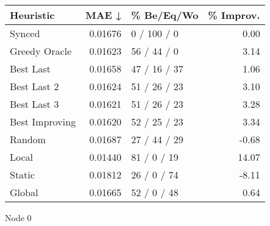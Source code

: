 \begin{tabular}{lrlr}
\toprule
\textbf{Heuristic} & \textbf{MAE ↓} & \textbf{\% Be/Eq/Wo} & \textbf{\% Improv.} \\
\midrule
            Synced &        0.01676 &          0 / 100 / 0 &                0.00 \\
     Greedy Oracle &        0.01623 &          56 / 44 / 0 &                3.14 \\
         Best Last &        0.01658 &         47 / 16 / 37 &                1.06 \\
       Best Last 2 &        0.01624 &         51 / 26 / 23 &                3.10 \\
       Best Last 3 &        0.01621 &         51 / 26 / 23 &                3.28 \\
    Best Improving &        0.01620 &         52 / 25 / 23 &                3.34 \\
            Random &        0.01687 &         27 / 44 / 29 &               -0.68 \\
             Local &        0.01440 &          81 / 0 / 19 &               14.07 \\
            Static &        0.01812 &          26 / 0 / 74 &               -8.11 \\
            Global &        0.01665 &          52 / 0 / 48 &                0.64 \\
\bottomrule
\end{tabular}
\caption{Node 0}
\label{tab:non_lr01_le2_bs4_0}
